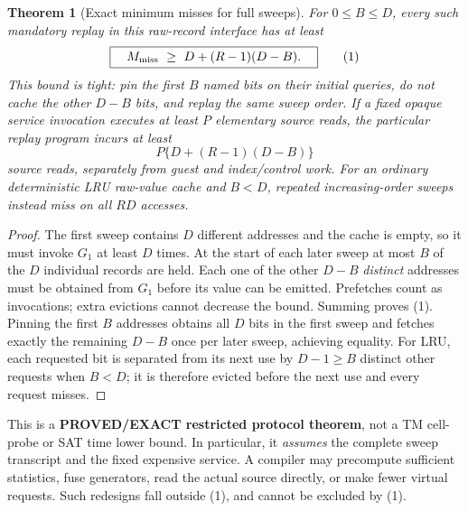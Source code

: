 \documentclass[11pt]{article}
\newtheorem{theorem}{Theorem}
\begin{document}
\begin{theorem}[Exact minimum misses for full sweeps]\label{th:miss}
For $0\le B\le D$, every such mandatory replay in this raw-record
interface has at least
\[
\boxed{\quad M_{\rm miss}\ \ge\
D+(R-1)(D-B).\quad}\tag{1}
\]
This bound is tight: pin the first $B$ named bits on their initial
queries, do not cache the other $D-B$ bits, and replay the same sweep
order. If a fixed opaque service invocation executes at least $P$
elementary source reads, the particular replay program incurs at least
\[
P\{D+(R-1)(D-B)\}
\]
source reads, separately from guest and index/control work. For an
ordinary deterministic LRU raw-value cache and $B<D$, repeated
increasing-order sweeps instead miss on all $RD$ accesses.
\end{theorem}
\begin{proof}
The first sweep contains $D$ different addresses and the cache is empty,
so it must invoke $G_1$ at least $D$ times. At the start of each later
sweep at most $B$ of the $D$ individual records are held. Each one of
the other $D-B$ \emph{distinct} addresses must be obtained from $G_1$
before its value can be emitted. Prefetches count as invocations;
extra evictions cannot decrease the bound. Summing proves (1).
Pinning the first $B$ addresses obtains all $D$ bits in the first
sweep and fetches exactly the remaining $D-B$ once per later sweep,
achieving equality. For LRU, each requested bit is separated from its
next use by $D-1\ge B$ distinct other requests when $B<D$; it is
therefore evicted before the next use and every request misses.
\end{proof}

This is a \textbf{PROVED/EXACT restricted protocol theorem}, not a
TM cell-probe or SAT time lower bound. In particular, it \emph{assumes}
the complete sweep transcript and the fixed expensive service.
A compiler may precompute sufficient statistics, fuse generators,
read the actual source directly, or make fewer virtual requests.
Such redesigns fall outside (1), and cannot be excluded by (1).
\end{document}
